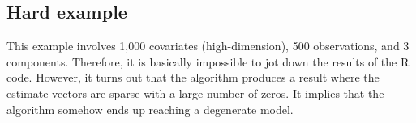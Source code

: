 \documentclass[11pt]{article}
\begin{document}
\subsection{Hard example}
This example involves 1,000 covariates (high-dimension), 500 observations, and 3 components. Therefore, it is basically impossible to jot down the results of the R code. However, it turns out that the algorithm produces a result where the estimate vectors are sparse with a large number of zeros. It implies that the algorithm somehow ends up reaching a degenerate model. 
\end{document}
